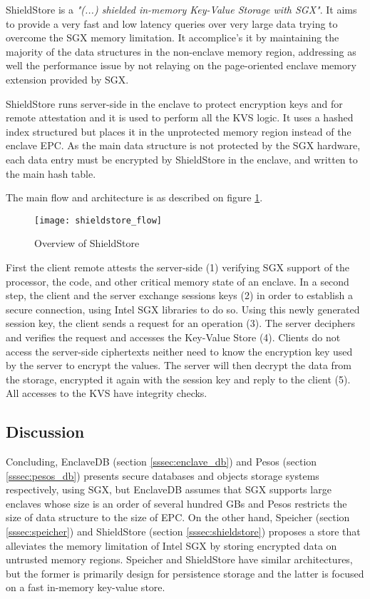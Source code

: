 ShieldStore \cite{shieldstore:1} is a \textit{"(...) shielded in-memory Key-Value Storage with \gls{SGX}"}. It aims to provide a very fast and low latency queries over very large data trying to overcome the \gls{SGX} memory limitation. It accomplice's it by maintaining the majority of the data structures in the non-enclave memory region, addressing as well the performance issue by not relaying on the page-oriented enclave memory extension provided by \gls{SGX}.

ShieldStore runs server-side in the enclave to protect encryption keys and for remote attestation and it is used to perform all the \gls{KVS} logic. It uses a hashed index structured but places it in the unprotected memory region instead of the enclave \gls{EPC}. As the main data structure is not protected by the \gls{SGX} hardware, each data entry must be encrypted by ShieldStore in the enclave, and written to the main hash table.

The main flow and architecture is as described on figure \ref{fig:shieldstore_overview}.

\begin{figure}[htbp]
	\centering
	{\texttt{[image: shieldstore\_flow]}}%
	\caption{Overview of ShieldStore}
	\label{fig:shieldstore_overview}
\end{figure}

First the client remote attests the server-side (1) verifying \gls{SGX} support of the processor, the code, and other critical memory state of an enclave. In a second step, the client and the server exchange sessions keys (2) in order to establish a secure connection, using Intel \gls{SGX} libraries to do so. Using this newly generated session key, the client sends a request for an operation (3). The server deciphers and verifies the request and accesses the Key-Value Store (4). Clients do not access the server-side ciphertexts neither need to know the encryption key used by the server to encrypt the values. The server will then decrypt the data from the storage, encrypted it again with the session key and reply to the client (5). All accesses to the \gls{KVS} have integrity checks.

\subsection{Discussion}
\label{ssec:s3_discussion}

Concluding, EnclaveDB (section \ref{sssec:enclave_db}) and Pesos (section \ref{sssec:pesos_db}) presents secure databases and objects storage systems respectively, using \gls{SGX}, but EnclaveDB assumes that \gls{SGX} supports large enclaves whose size is an order of several hundred \glspl{GB} and Pesos restricts the size of data structure to the size of \gls{EPC}. On the other hand, Speicher (section \ref{sssec:speicher}) and ShieldStore (section \ref{sssec:shieldstore}) proposes a store that alleviates the memory limitation of Intel \gls{SGX} by storing encrypted data on untrusted memory regions. Speicher and ShieldStore have similar architectures, but the former is primarily design for persistence storage and the latter is focused on a fast in-memory key-value store.

